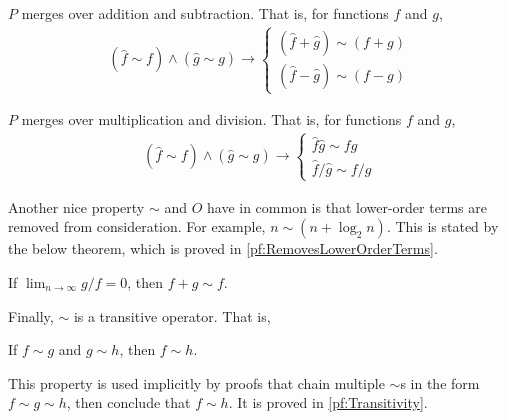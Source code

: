 \begin{theorem}
\label{thm:MergesOverArithmeticAdd}
	$P$ merges over addition and subtraction. That is, for functions $f$ and $g$,
	\begin{align*}
	(\hat{f} \sim f) \land (\hat{g} \sim g) \rightarrow \begin{cases}
		(\hat{f} + \hat{g}) \sim (f + g)\\
		(\hat{f} - \hat{g}) \sim (f - g)
	\end{cases}
	\end{align*}
\end{theorem}

\begin{theorem}
\label{thm:MergesOverArithmeticMultiply}
	$P$ merges over multiplication and division. That is, for functions $f$ and $g$,
	\begin{align*}
	(\hat{f} \sim f) \land (\hat{g} \sim g) \rightarrow \begin{cases}
	\hat{f}\hat{g} \sim fg\\
	\hat{f} / \hat{g} \sim f / g
	\end{cases}
	\end{align*}
\end{theorem}

Another nice property $\sim$ and $O$ have in common is that lower-order terms are removed from consideration. For example, $n \sim (n + \log_2 n)$. This is stated by the below theorem, which is proved in \ref{pf:RemovesLowerOrderTerms}.

\begin{theorem}
\label{thm:RemovesLowerOrderTerms}
	If $\lim_{n \to \infty} g / f = 0$, then $f + g \sim f$.
\end{theorem}

Finally, $\sim$ is a transitive operator. That is,

\begin{theorem}
\label{thm:Transitivity}
	If $f \sim g$ and $g \sim h$, then $f \sim h$.
\end{theorem}

This property is used implicitly by proofs that chain multiple $\sim$s in the form $f \sim g \sim h$, then conclude that $f \sim h$. It is proved in \ref{pf:Transitivity}.